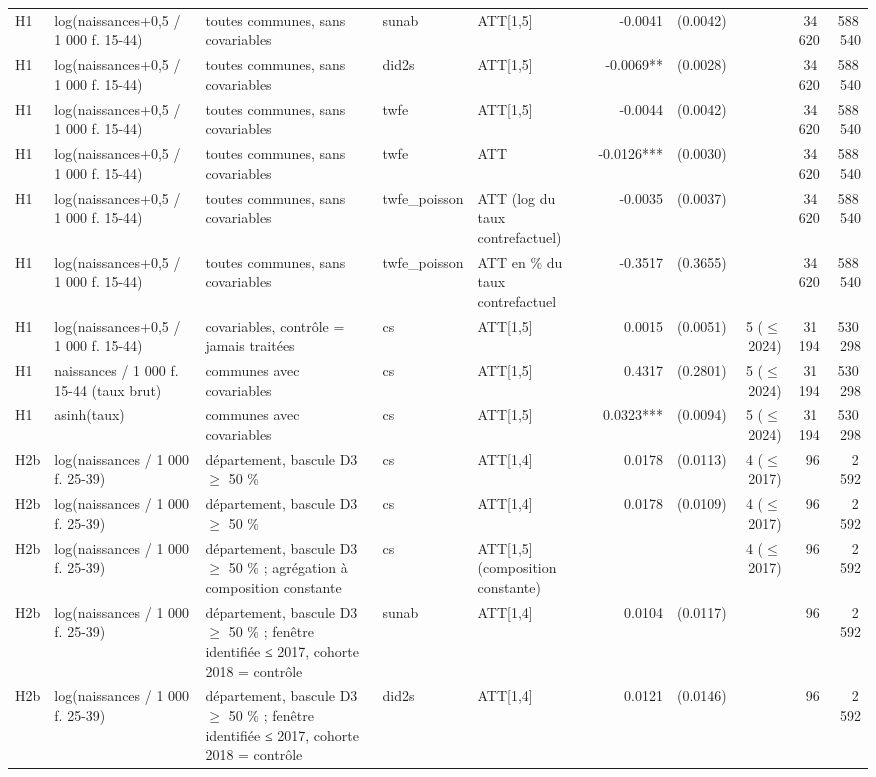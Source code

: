 \begin{table}
\begin{threeparttable}
\begin{tabular}{lp{3.8cm}p{6.5cm}lp{3.5cm}rrrrr}
H1 & log(naissances+0,5 / 1 000 f. 15-44) & toutes communes, sans covariables & sunab & ATT[1,5] & -0.0041 & (0.0042) &  & 34\,620 & 588\,540 \\
H1 & log(naissances+0,5 / 1 000 f. 15-44) & toutes communes, sans covariables & did2s & ATT[1,5] & -0.0069** & (0.0028) &  & 34\,620 & 588\,540 \\
H1 & log(naissances+0,5 / 1 000 f. 15-44) & toutes communes, sans covariables & twfe & ATT[1,5] & -0.0044 & (0.0042) &  & 34\,620 & 588\,540 \\
H1 & log(naissances+0,5 / 1 000 f. 15-44) & toutes communes, sans covariables & twfe & ATT & -0.0126*** & (0.0030) &  & 34\,620 & 588\,540 \\
H1 & log(naissances+0,5 / 1 000 f. 15-44) & toutes communes, sans covariables & twfe\_poisson & ATT (log du taux contrefactuel) & -0.0035 & (0.0037) &  & 34\,620 & 588\,540 \\
H1 & log(naissances+0,5 / 1 000 f. 15-44) & toutes communes, sans covariables & twfe\_poisson & ATT en \% du taux contrefactuel & -0.3517 & (0.3655) &  & 34\,620 & 588\,540 \\
H1 & log(naissances+0,5 / 1 000 f. 15-44) & covariables, contrôle = jamais traitées & cs & ATT[1,5] & 0.0015 & (0.0051) & 5 ($\leq$ 2024) & 31\,194 & 530\,298 \\
H1 & naissances / 1 000 f. 15-44 (taux brut) & communes avec covariables & cs & ATT[1,5] & 0.4317 & (0.2801) & 5 ($\leq$ 2024) & 31\,194 & 530\,298 \\
H1 & asinh(taux) & communes avec covariables & cs & ATT[1,5] & 0.0323*** & (0.0094) & 5 ($\leq$ 2024) & 31\,194 & 530\,298 \\
H2b & log(naissances / 1 000 f. 25-39) & département, bascule D3 $\geq$ 50 \% & cs & ATT[1,4] & 0.0178 & (0.0113) & 4 ($\leq$ 2017) & 96 & 2\,592 \\
H2b & log(naissances / 1 000 f. 25-39) & département, bascule D3 $\geq$ 50 \% & cs & ATT[1,4] & 0.0178 & (0.0109) & 4 ($\leq$ 2017) & 96 & 2\,592 \\
H2b & log(naissances / 1 000 f. 25-39) & département, bascule D3 $\geq$ 50 \% ; agrégation à composition constante & cs & ATT[1,5] (composition constante) &  &  & 4 ($\leq$ 2017) & 96 & 2\,592 \\
H2b & log(naissances / 1 000 f. 25-39) & département, bascule D3 $\geq$ 50 \% ; fenêtre identifiée ≤ 2017, cohorte 2018 = contrôle & sunab & ATT[1,4] & 0.0104 & (0.0117) &  & 96 & 2\,592 \\
H2b & log(naissances / 1 000 f. 25-39) & département, bascule D3 $\geq$ 50 \% ; fenêtre identifiée ≤ 2017, cohorte 2018 = contrôle & did2s & ATT[1,4] & 0.0121 & (0.0146) &  & 96 & 2\,592 \\

\end{tabular}
\end{threeparttable}
\end{table}
